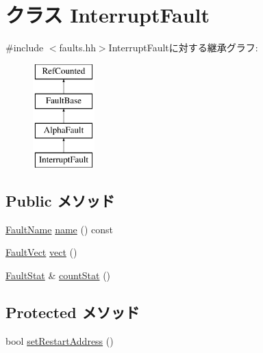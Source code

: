 \hypertarget{classAlphaISA_1_1InterruptFault}{
\section{クラス InterruptFault}
\label{classAlphaISA_1_1InterruptFault}
}


{\ttfamily \#include $<$faults.hh$>$}InterruptFaultに対する継承グラフ:\begin{figure}[H]
\begin{center}
\leavevmode
\includegraphics[height=4cm]{classAlphaISA_1_1InterruptFault}
\end{center}
\end{figure}
\subsection*{Public メソッド}
\begin{DoxyCompactItemize}
\item 
\hyperlink{sim_2faults_8hh_abb196df64725e5c2568c900cf130d8d7}{FaultName} \hyperlink{classAlphaISA_1_1InterruptFault_a73adb23259baf912a81683a9790a303f}{name} () const 
\item 
\hyperlink{classm5_1_1params_1_1Addr}{FaultVect} \hyperlink{classAlphaISA_1_1InterruptFault_ae15c5d7ab0162821b93d668d0b225198}{vect} ()
\item 
\hyperlink{classStats_1_1Scalar}{FaultStat} \& \hyperlink{classAlphaISA_1_1InterruptFault_a6c79663c761ff57265459f7e3aefaf4c}{countStat} ()
\end{DoxyCompactItemize}
\subsection*{Protected メソッド}
\begin{DoxyCompactItemize}
\item 
bool \hyperlink{classAlphaISA_1_1InterruptFault_a92cd7f56a5213322fd8b3d1dbe9a7136}{setRestartAddress} ()
\end{DoxyCompactItemize}
